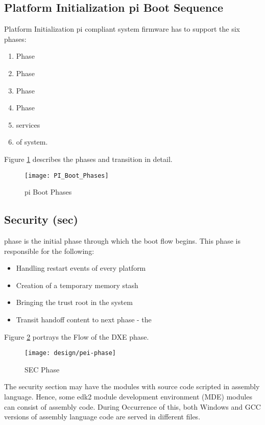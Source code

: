 \subsection{Platform Initialization \gls{pi} Boot Sequence}
Platform Initialization \gls{pi} compliant system firmware has to support the six phases: 
\begin{enumerate}
	\item {} Phase
	\item {} Phase
	\item {} Phase
	\item {} Phase
	\item {} services 
	\item {} of system. 
\end{enumerate}
Figure \ref{fig:design-pi-boot-phases} describes the phases and transition in detail.

\begin{figure}[!htbp]
	\centering
	\texttt{[image: PI\_Boot\_Phases]}
	\caption{\gls{pi} Boot Phases}\label{fig:design-pi-boot-phases}
\end{figure}

\subsection{Security (\gls{sec})}
 phase is the initial phase through which the boot flow begins. This phase is responsible for the following:
\begin{itemize}
	\item Handling restart events of every platform
	\item Creation of a temporary memory stash
	\item Bringing the trust root in the system
	\item Transit handoff content to next phase - the 
\end{itemize}

Figure \ref{fig:sec-phase} portrays the Flow of the DXE phase.

\begin{figure}[!htbp]
	\centering
	\texttt{[image: design/pei-phase]}
	\caption{SEC Phase}\label{fig:sec-phase}
\end{figure}

The security section may have the modules with source code scripted in assembly language. Hence, some \gls{edk2} module development environment (MDE) modules can consist of assembly code. During Occurrence of this, both Windows and GCC versions of assembly language code are served in different files.

